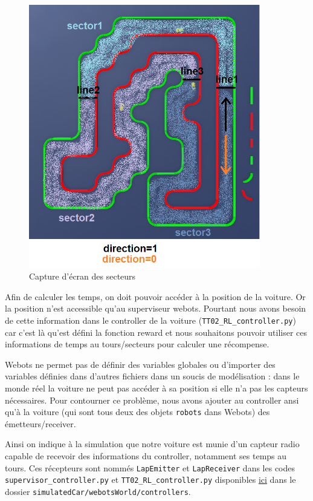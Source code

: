 \documentclass[french]{article}
\begin{document}
\begin{figure}[H]
    \centering
    \includegraphics[width=0.9\textwidth]{Images/sector_lines_map.png}
    \caption{Capture d'écran des secteurs}
    \label{fig:secteurs}
\end{figure}

Afin de calculer les temps, on doit pouvoir accéder à la position de la voiture. Or la position n'est accessible qu'au superviseur webots. Pourtant nous avons besoin de cette information dans le controller de la voiture (\verb|TT02_RL_controller.py|) car c'est là qu'est défini la fonction reward et nous souhaitons pouvoir utiliser ces informations de temps au tours/secteurs pour calculer une récompense.
\vspace{0.5cm}

Webots ne permet pas de définir des variables globales ou d'importer des variables définies dans d'autres fichiers dans un soucis de modélisation : dans le monde réel la voiture ne peut pas accéder à sa position si elle n'a pas les capteurs nécessaires. Pour contourner ce problème, nous avons ajouter au controller ansi qu'à la voiture (qui sont tous deux des objets \verb|robots| dans Webots) des émetteurs/receiver. \vspace{0.5cm}

Ainsi on indique à la simulation que notre voiture est munie d'un capteur radio capable de recevoir des informations du controller, notamment ses temps au tours. Ces récepteurs sont nommés \verb|LapEmitter| et \verb|LapReceiver| dans les codes \verb|supervisor_controller.py| et \verb|TT02_RL_controller.py| disponibles \href{https://github.com/basileplus/RCAutonomousCar.git}{ici} dans le dossier \verb|simulatedCar/webotsWorld/controllers|.
\end{document}
